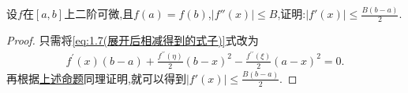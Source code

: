\documentclass[lang=cn,newtx,10pt,scheme=chinese]{../Template/elegantbook}
\begin{document}
\begin{corollary}\label{pro:一阶导数可被二阶导数和原函数控制(端点函数值相同的情形)}
    设\(f\)在\([a,b]\)上二阶可微,且\(f(a)=f(b)\),\(\vert f''(x)\vert\leqslant B\),证明:\(\vert f'(x)\vert\leqslant\frac{B\left( b-a \right)}{2}\).
\end{corollary}
\begin{proof}
    只需将\eqref{eq:1.7(展开后相减得到的式子)}式改为
    \begin{align*}
        f^{\prime}(x)(b-a)+\frac{f^{\prime\prime}(\eta )}{2}(b-x)^2-\frac{f^{\prime\prime}(\xi )}{2}(a-x)^2=0.
    \end{align*}
    再根据\hyperref[pro:一阶导数可被二阶导数和原函数控制]{上述命题}同理证明,就可以得到\(\vert f'(x)\vert\leqslant\frac{B\left( b-a \right)}{2}\).
\end{proof}
\end{document}
